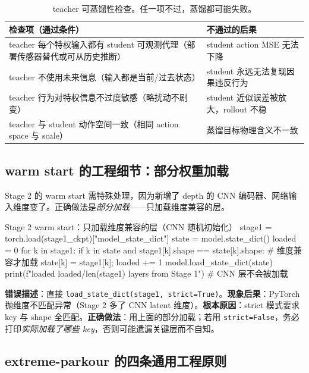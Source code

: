 \begin{table}[H]
\centering
\small
\caption{teacher 可蒸馏性检查。任一项不过，蒸馏都可能失败。}
\label{tab:rlmc-priv-distillable}
\begin{tabular}{@{}p{6.2cm}p{5.6cm}@{}}
\toprule
检查项（通过条件） & 不通过的后果 \\
\midrule
teacher 每个特权输入都有 student 可观测代理（部署传感器替代或可从历史推断） & student action MSE 无法下降 \\
teacher 不使用未来信息（输入都是当前/过去状态） & student 永远无法复现因果违反行为 \\
teacher 行为对特权信息不过度敏感（略扰动不剧变） & student 近似误差被放大，rollout 不稳 \\
teacher 与 student 动作空间一致（相同 action space 与 scale） & 蒸馏目标物理含义不一致 \\
\bottomrule
\end{tabular}
\end{table}

\subsection{warm start 的工程细节：部分权重加载}
\label{sec:rlmc-priv-warmstart}

Stage 2 的 warm start 需特殊处理，因为新增了 depth 的 CNN 编码器、网络输入维度变了。正确做法是\emph{部分加载}——只加载维度兼容的层。

\begin{codebox}[Python]{Stage 2 warm start：只加载维度兼容的层（CNN 随机初始化）}
stage1 = torch.load(stage1_ckpt)["model_state_dict"]
state  = model.state_dict()
loaded = 0
for k in stage1:
    if k in state and stage1[k].shape == state[k].shape:  # 维度兼容才加载
        state[k] = stage1[k]; loaded += 1
model.load_state_dict(state)
print(f"loaded {loaded}/{len(stage1)} layers from Stage 1")  # CNN 层不会被加载
\end{codebox}

\begin{pitfall}[warm start 时 strict=True 导致维度不匹配崩溃]
\textbf{错误描述}：直接 \verb|load_state_dict(stage1, strict=True)|。\textbf{现象后果}：PyTorch 抛维度不匹配异常（Stage 2 多了 CNN latent 维度）。\textbf{根本原因}：strict 模式要求 key 与 shape 全匹配。\textbf{正确做法}：用上面的部分加载；若用 \verb|strict=False|，务必打印\emph{实际加载了哪些 key}，否则可能遗漏关键层而不自知。
\end{pitfall}

\subsection{extreme-parkour 的四条通用工程原则}
\label{sec:rlmc-priv-parkour-principles}

